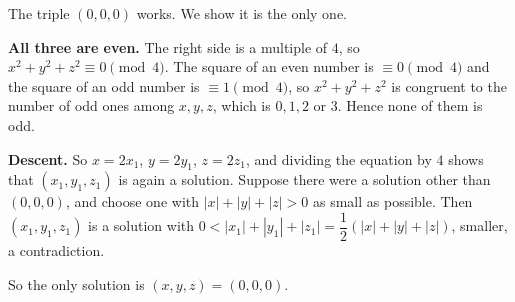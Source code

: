 The triple $(0,0,0)$ works. We show it is the only one.

\textbf{All three are even.} The right side is a multiple of $4$, so $x^2+y^2+z^2\equiv0\pmod4$. The square of an even number is $\equiv0\pmod4$ and the square of an odd number is $\equiv1\pmod4$, so $x^2+y^2+z^2$ is congruent to the number of odd ones among $x,y,z$, which is $0,1,2$ or $3$. Hence none of them is odd.

\textbf{Descent.} So $x=2x_1$, $y=2y_1$, $z=2z_1$, and dividing the equation by $4$ shows that $(x_1,y_1,z_1)$ is again a solution. Suppose there were a solution other than $(0,0,0)$, and choose one with $|x|+|y|+|z|>0$ as small as possible. Then $(x_1,y_1,z_1)$ is a solution with $0<|x_1|+|y_1|+|z_1|=\dfrac12\left(|x|+|y|+|z|\right)$, smaller, a contradiction.

So the only solution is $\boxed{(x,y,z)=(0,0,0)}$.
